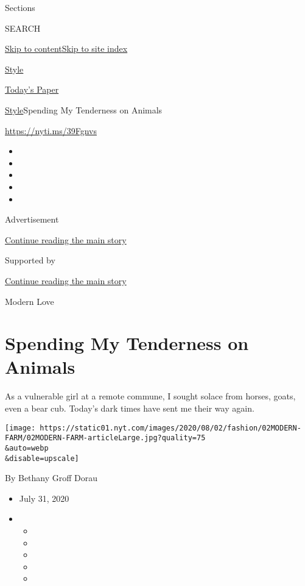 Sections

SEARCH

\protect\hyperlink{site-content}{Skip to
content}\protect\hyperlink{site-index}{Skip to site index}

\href{https://www.nytimes.com/section/style}{Style}

\href{https://myaccount.nytimes.com/auth/login?response_type=cookie\&client_id=vi}{}

\href{https://www.nytimes.com/section/todayspaper}{Today's Paper}

\href{/section/style}{Style}\textbar{}Spending My Tenderness on Animals

\url{https://nyti.ms/39Fgnvs}

\begin{itemize}
\item
\item
\item
\item
\item
\end{itemize}

Advertisement

\protect\hyperlink{after-top}{Continue reading the main story}

Supported by

\protect\hyperlink{after-sponsor}{Continue reading the main story}

Modern Love

\hypertarget{spending-my-tenderness-on-animals}{%
\section{Spending My Tenderness on
Animals}\label{spending-my-tenderness-on-animals}}

As a vulnerable girl at a remote commune, I sought solace from horses,
goats, even a bear cub. Today's dark times have sent me their way again.

\texttt{[image: https://static01.nyt.com/images/2020/08/02/fashion/02MODERN-FARM/02MODERN-FARM-articleLarge.jpg?quality=75\\\&auto=webp\\\&disable=upscale]}

By Bethany Groff Dorau

\begin{itemize}
\item
  July 31, 2020
\item
  \begin{itemize}
  \item
  \item
  \item
  \item
  \item
  \end{itemize}
\end{itemize}

